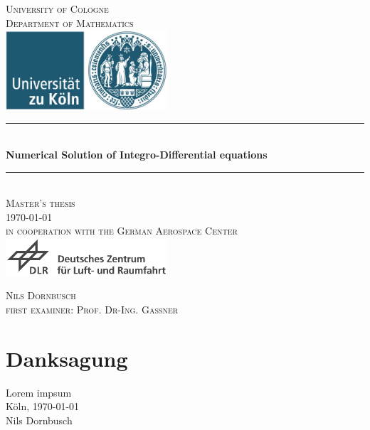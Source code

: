 \documentclass[12pt,a4paper,twoside, open=right]{scrreprt}
\theoremstyle{definition}
\theoremstyle{plain}
\begin{document}
\begin{titlepage}
\pagestyle{empty}
\begin{center}
\newcommand{\HRule}{\rule{\linewidth}{0.7mm}}
\textsc{\LARGE University of Cologne }\\ [0.4cm]
\textsc{ Department of Mathematics} \\[1.5cm]
\includegraphics[width=0.45\textwidth]{uni}\\[1.5cm]  %
\HRule \\[0.4cm]
{ \huge \bfseries Numerical Solution of Integro-Differential equations}\\[0.4cm]
\HRule \\[1cm]
\textsc{\Large Master's thesis}\\[2mm]
\textsc{\today}\\[10mm]
\textsc{in cooperation with the German Aerospace Center}\\[1.0cm]
\includegraphics[width=0.45\textwidth]{DLR-Logo-full}\\[1.0cm]


  




\begin{center}

\textsc{\Large Nils Dornbusch} \\[3pt]
\textsc{\Large first examiner: Prof. Dr-Ing. Gassner}
\end{center}
\end{center}
\end{titlepage}
\chapter*{Danksagung}
Lorem impsum
\\[1cm]
Köln, \today 
\\[1cm]
Nils Dornbusch
\newpage
\tableofcontents
\newpage
\end{document}
